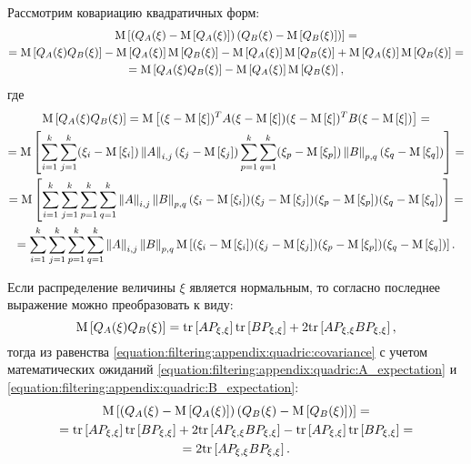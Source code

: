 Рассмотрим ковариацию квадратичных форм:
\begin{multline} \label{equation:filtering:appendix:quadric:preliminary_covariance}
    \mathrm{M} \left [ \left ( Q_A(\xi) - \mathrm{M} \left [ Q_A(\xi) \right ] \right ) \left ( Q_B(\xi) - \mathrm{M} \left [ Q_B(\xi) \right ] \right ) \right ] = \\
    = \mathrm{M} \left [ Q_A(\xi) Q_B(\xi) \right ]
        - \mathrm{M} \left [ Q_A(\xi) \right ] \mathrm{M} \left [ Q_B(\xi) \right ]
        - \mathrm{M} \left [ Q_A(\xi) \right ] \mathrm{M} \left [ Q_B(\xi) \right ]
        + \mathrm{M} \left [ Q_A(\xi) \right ] \mathrm{M} \left [ Q_B(\xi) \right ] = \\
    = \mathrm{M} \left [ Q_A(\xi) Q_B(\xi) \right ]
        - \mathrm{M} \left [ Q_A(\xi) \right ] \mathrm{M} \left [ Q_B(\xi) \right ] ,
\end{multline}
где
\begin{multline*}
    \mathrm{M} \left [ Q_A(\xi) Q_B(\xi) \right ]
        = \mathrm{M} \left [ ( \xi - \mathrm{M} \left [ \xi \right ] )^T A ( \xi - \mathrm{M} \left [ \xi \right ] ) ( \xi - \mathrm{M} \left [ \xi \right ] )^T B ( \xi - \mathrm{M} \left [ \xi \right ] ) \right ] = \\
    = \mathrm{M} \left [ \sum_{i=1}^k \sum_{j=1}^k ( \xi_i - \mathrm{M} \left [ \xi_i \right ] ) \left \| A \right \|_{i,j} ( \xi_j - \mathrm{M} \left [ \xi_j \right ] ) \sum_{p=1}^k \sum_{q=1}^k ( \xi_p - \mathrm{M} \left [ \xi_p \right ] ) \left \| B \right \|_{p,q} ( \xi_q - \mathrm{M} \left [ \xi_q \right ] )  \right ] = \\
    = \mathrm{M} \left [ \sum_{i=1}^k \sum_{j=1}^k \sum_{p=1}^k \sum_{q=1}^k \left \| A \right \|_{i,j} \left \| B \right \|_{p,q} ( \xi_i - \mathrm{M} \left [ \xi_i \right ] ) ( \xi_j - \mathrm{M} \left [ \xi_j \right ] ) ( \xi_p - \mathrm{M} \left [ \xi_p \right ] ) ( \xi_q - \mathrm{M} \left [ \xi_q \right ] )  \right ] = \\
    = \sum_{i=1}^k \sum_{j=1}^k \sum_{p=1}^k \sum_{q=1}^k \left \| A \right \|_{i,j} \left \| B \right \|_{p,q} \mathrm{M} \left [ ( \xi_i - \mathrm{M} \left [ \xi_i \right ] ) ( \xi_j - \mathrm{M} \left [ \xi_j \right ] ) ( \xi_p - \mathrm{M} \left [ \xi_p \right ] ) ( \xi_q - \mathrm{M} \left [ \xi_q \right ] )  \right ] .
\end{multline*}

Если распределение величины $\xi$ является нормальным, то согласно \cite[стр. 55]{EATN} последнее выражение можно преобразовать к виду:
$$
    \mathrm{M} \left [ Q_A(\xi) Q_B(\xi) \right ] = \mathrm{tr} \left [ A P_{\xi,\xi} \right ] \mathrm{tr} \left [ B P_{\xi,\xi} \right ] + 2 \mathrm{tr} \left [ A P_{\xi,\xi} B P_{\xi,\xi} \right ],
$$
тогда из равенства \eqref{equation:filtering:appendix:quadric:covariance} с учетом математических ожиданий \eqref{equation:filtering:appendix:quadric:A_expectation} и
\eqref{equation:filtering:appendix:quadric:B_expectation}:
\begin{multline} \label{equation:filtering:appendix:quadric:covariance}
    \mathrm{M} \left [ \left ( Q_A(\xi) - \mathrm{M} \left [ Q_A(\xi) \right ] \right ) \left ( Q_B(\xi) - \mathrm{M} \left [ Q_B(\xi) \right ] \right ) \right ] = \\
    = \mathrm{tr} \left [ A P_{\xi,\xi} \right ] \mathrm{tr} \left [ B P_{\xi,\xi} \right ] + 2 \mathrm{tr} \left [ A P_{\xi,\xi} B P_{\xi,\xi} \right ] - \mathrm{tr} \left [ A P_{\xi,\xi} \right ] \mathrm{tr} \left [ B P_{\xi,\xi} \right ] = \\
    = 2 \mathrm{tr} \left [ A P_{\xi,\xi} B P_{\xi,\xi} \right ]
    .
\end{multline}